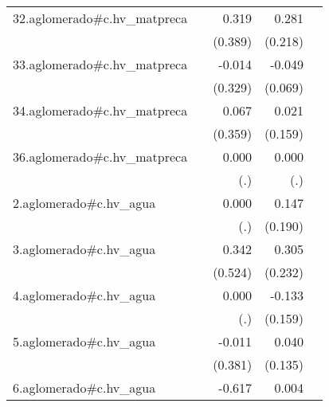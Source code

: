 {\begin{longtable}{l*{4}{D{.}{.}{-1}}}
\addlinespace
32.aglomerado#c.hv\_matpreca&                     &       0.319         &       0.281         &                     \\
            &                     &     (0.389)         &     (0.218)         &                     \\
\addlinespace
33.aglomerado#c.hv\_matpreca&                     &      -0.014         &      -0.049         &                     \\
            &                     &     (0.329)         &     (0.069)         &                     \\
\addlinespace
34.aglomerado#c.hv\_matpreca&                     &       0.067         &       0.021         &                     \\
            &                     &     (0.359)         &     (0.159)         &                     \\
\addlinespace
36.aglomerado#c.hv\_matpreca&                     &       0.000         &       0.000         &                     \\
            &                     &         (.)         &         (.)         &                     \\
\addlinespace
2.aglomerado#c.hv\_agua&                     &       0.000         &       0.147         &                     \\
            &                     &         (.)         &     (0.190)         &                     \\
\addlinespace
3.aglomerado#c.hv\_agua&                     &       0.342         &       0.305         &                     \\
            &                     &     (0.524)         &     (0.232)         &                     \\
\addlinespace
4.aglomerado#c.hv\_agua&                     &       0.000         &      -0.133         &                     \\
            &                     &         (.)         &     (0.159)         &                     \\
\addlinespace
5.aglomerado#c.hv\_agua&                     &      -0.011         &       0.040         &                     \\
            &                     &     (0.381)         &     (0.135)         &                     \\
\addlinespace
6.aglomerado#c.hv\_agua&                     &      -0.617         &       0.004         &                     \\

\end{longtable}}
